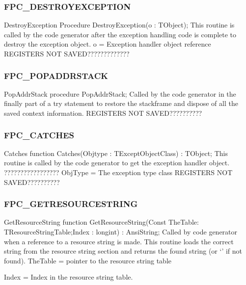 \documentclass [a4paper,12pt]{article}
\begin{document}
\subsubsection{FPC{\_}DESTROYEXCEPTION}
\label{subsubsec:mylabel65}

\begin{procedure}{DestroyException}
\Declaration
Procedure DestroyException(o : TObject);
\Description
This routine is called by the code generator after the exception handling
code is complete to destroy the exception object.
\Parameters 
o = Exception handler object reference
\Notes
REGISTERS NOT SAVED?????????????
\end{procedure}

\subsubsection{FPC{\_}POPADDRSTACK}
\label{subsubsec:mylabel66}

\begin{procedure}{PopAddrStack}
\Declaration
procedure PopAddrStack;
\Description
Called by the code generator in the finally part of a try statement to
restore the stackframe and dispose of all the saved context information.
\Notes
REGISTERS NOT SAVED??????????
\end{procedure}

\subsubsection{FPC{\_}CATCHES}
\label{subsubsec:mylabel67}

\begin{function}{Catches}
\Declaration
function Catches(Objtype : TExceptObjectClass) : TObject;
\Description
This routine is called by the code generator to get the exception handler
object. ?????????????????
\Parameters
ObjType = The exception type class
\Notes
REGISTERS NOT SAVED??????????
\end{function}

\subsubsection{FPC{\_}GETRESOURCESTRING}
\label{subsubsec:mylabel68}

\begin{function}{GetResourceString}
\Declaration
function GetResourceString(Const TheTable: TResourceStringTable;Index : longint) : AnsiString;
\Description
Called by code generator when a reference to a resource string is made. This
routine loads the correct string from the resource string section and
returns the found string (or `' if not found).
\Parameters
TheTable = pointer to the resource string table \par
Index = Index in the resource string table.
\end{function}
\end{document}
